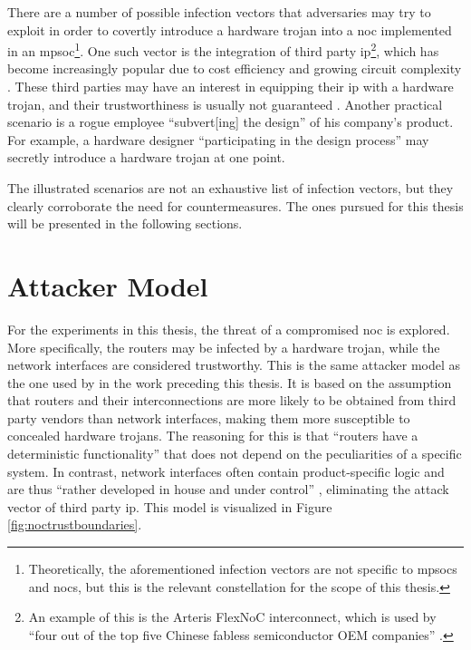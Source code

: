 There are a number of possible infection vectors that adversaries may try to exploit in order to covertly introduce a hardware trojan into a \gls{noc}
implemented in an \gls{mpsoc}\footnote{Theoretically, the aforementioned infection vectors are not specific to \glspl{mpsoc} and \glspl{noc}, but
this is the relevant constellation for the scope of this thesis.}. One such vector is the integration of third party \gls{ip}\footnote{An example of
this is the Arteris FlexNoC interconnect, which is used by \enquote{four out of the top five Chinese fabless semiconductor OEM companies}
\cite[2]{ancajas14fortnocs}.}, which has become increasingly popular due to cost efficiency and growing circuit complexity
\cites[1]{ancajas14fortnocs}[2]{bhunia14hardwaretrojans}. These third parties may have an interest in equipping their \gls{ip} with a hardware trojan,
and their trustworthiness is usually not guaranteed \cite[3]{sethumadhavan15trustworthyhardware}.
Another practical scenario is a rogue employee \enquote{subvert[ing] the design} \cite[3]{sethumadhavan15trustworthyhardware} of his
company's product. For example, a hardware designer \enquote{participating in the design process} \cite[3]{sethumadhavan15trustworthyhardware} may
secretly introduce a hardware trojan at one point. 

The illustrated scenarios are not an exhaustive list of infection vectors, but they clearly corroborate the need for countermeasures. The ones pursued
for this thesis will be presented in the following sections.

\section{Attacker Model}
For the experiments in this thesis, the threat of a compromised \gls{noc} is explored. More specifically, the routers may be infected by a hardware
trojan, while the network interfaces are considered trustworthy. This is the same attacker model as the one used by \citeauthor{moriam18activeattackers}
\cite{moriam18activeattackers} in the work preceding this thesis. It is based on the assumption that routers and their interconnections are
more likely to be obtained from third party vendors than network interfaces, making them more susceptible to concealed hardware trojans. The reasoning
for this is that \enquote{routers have a deterministic functionality} \cite[2]{moriam18activeattackers} that does not depend on the peculiarities of
a specific system. In contrast, network interfaces often contain product-specific logic and are thus \enquote{rather developed in house and under
control} \cite[2]{moriam18activeattackers}, eliminating the attack vector of third party \gls{ip}. This model is visualized in Figure
\vref{fig:noctrustboundaries}.

